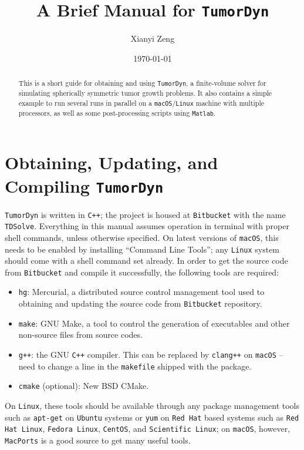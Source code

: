 \documentclass{amsproc}
\theoremstyle{definition}
\theoremstyle{remark}
\numberwithin{equation}{section}
\numberwithin{figure}{section}
\begin{document}
\title[\texttt{TumorDyn} Manual]{\bf A Brief Manual for \texttt{TumorDyn}}
\author[X.~Zeng]{Xianyi Zeng}
\address{Department of Mathematical Sciences, University of Texas at El Paso, El Paso TX 79902, United States.\\
         Tel.: +1-915-747-6759}
\date{\today}



\begin{abstract}
This is a short guide for obtaining and using \texttt{TumorDyn}, a finite-volume solver for simulating spherically symmetric tumor growth problems.
It also contains a simple example to run several runs in parallel on a \texttt{macOS}/\texttt{Linux} machine with multiple processors, as well as some post-processing scripts using \texttt{Matlab}.
\end{abstract}

\maketitle

\setcounter{tocdepth}{2}
\tableofcontents

\section{Obtaining, Updating, and Compiling \texttt{TumorDyn}}

\texttt{TumorDyn} is written in \texttt{C++}; the project is housed at \texttt{Bitbucket} with the name \texttt{TDSolve}.
Everything in this manual assumes operation in terminal with proper shell commands, unless otherwise specified.
On latest versions of \texttt{macOS}, this needs to be enabled by installing ``Command Line Tools''; any \texttt{Linux} system should come with a shell command set already.
In order to get the source code from \texttt{Bitbucket} and compile it successfully, the following tools are required:
\begin{itemize}
\item \texttt{hg}: Mercurial, a distributed source control management tool used to obtaining and updating the source code from \texttt{Bitbucket} repository.
\item \texttt{make}: GNU Make, a tool to control the generation of executables and other non-source files from source codes.
\item \texttt{g++}: the GNU \texttt{C++} compiler. This can be replaced by \texttt{clang++} on \texttt{macOS} -- need to change a line in the \texttt{makefile} shipped with the package.
\item \texttt{cmake} (optional): New BSD CMake.
\end{itemize}
On \texttt{Linux}, these tools should be available through any package management tools such as \texttt{apt-get} on \texttt{Ubuntu} systems or \texttt{yum} on \texttt{Red Hat} based systems such as \texttt{Red Hat Linux}, \texttt{Fedora Linux}, \texttt{CentOS}, and \texttt{Scientific Linux}; on \texttt{macOS}, however, \texttt{MacPorts} is a good source to get many useful tools. 
\end{document}
